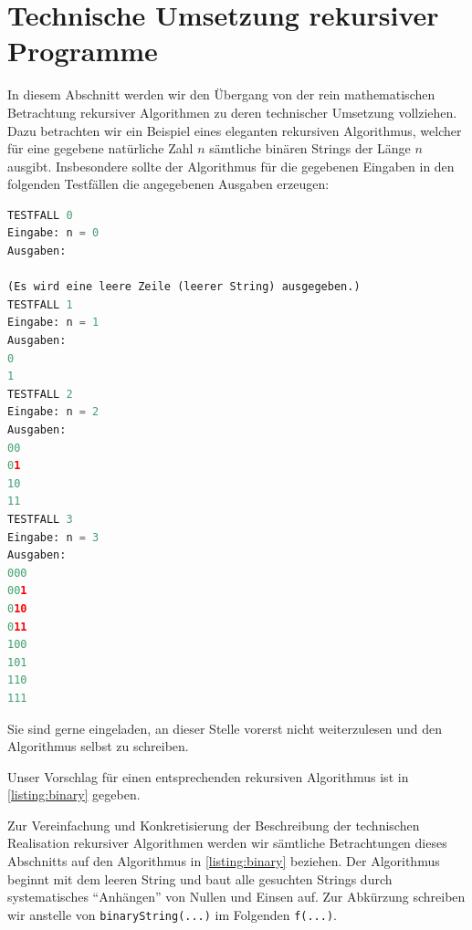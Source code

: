 \section{Technische Umsetzung rekursiver Programme}\label{technisch}
In diesem Abschnitt werden wir den Übergang von der rein mathematischen Betrachtung rekursiver Algorithmen zu deren technischer Umsetzung vollziehen. Dazu betrachten wir ein Beispiel eines eleganten rekursiven Algorithmus, welcher für eine gegebene natürliche Zahl $n$ sämtliche binären Strings der Länge $n$ ausgibt. Insbesondere sollte der Algorithmus für die gegebenen Eingaben in den folgenden Testfällen die angegebenen Ausgaben erzeugen:
\begin{lstlisting}[language=Python,caption=binäre Strings rekursiv ausgeben,numbers=none]
TESTFALL 0
Eingabe: n = 0
Ausgaben:

(Es wird eine leere Zeile (leerer String) ausgegeben.)
TESTFALL 1
Eingabe: n = 1
Ausgaben:
0
1
TESTFALL 2
Eingabe: n = 2
Ausgaben:
00
01
10
11
TESTFALL 3
Eingabe: n = 3
Ausgaben:
000
001
010
011
100
101
110
111
\end{lstlisting}
Sie sind gerne eingeladen, an dieser Stelle vorerst nicht weiterzulesen und den Algorithmus selbst zu schreiben.

Unser Vorschlag für einen entsprechenden rekursiven Algorithmus ist in \cref{listing:binary} gegeben.


Zur Vereinfachung und Konkretisierung der Beschreibung der technischen Realisation rekursiver Algorithmen werden wir sämtliche Betrachtungen dieses Abschnitts auf den Algorithmus in \cref{listing:binary} beziehen. Der Algorithmus beginnt mit dem leeren String und baut alle gesuchten Strings durch systematisches \enquote{Anhängen} von Nullen und Einsen auf. Zur Abkürzung schreiben wir anstelle von \lstinline|binaryString(...)| im Folgenden \lstinline|f(...)|.

